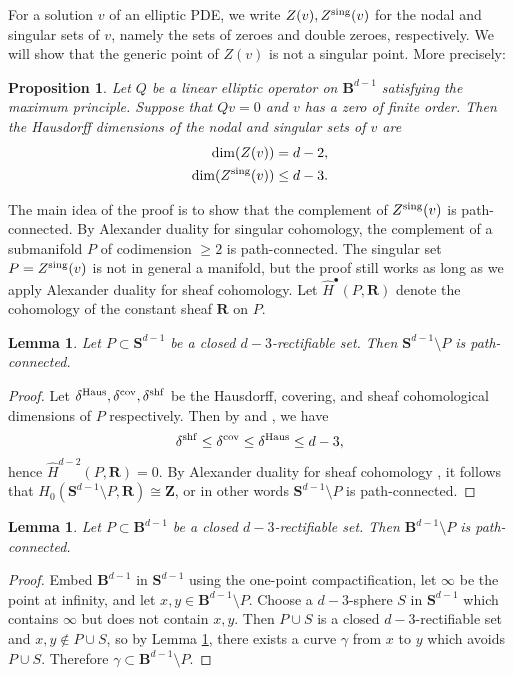 \documentclass[reqno,11pt]{amsart}
\newcommand{\ZZ}{\mathbf{Z}}
\newcommand{\RR}{\mathbf{R}}
\newcommand{\Sph}{\mathbf S}
\newcommand{\Ball}{\mathbf{B}}
\newtheorem{lemma}[theorem]{Lemma}
\newtheorem{proposition}[theorem]{Proposition}
\theoremstyle{definition}
\numberwithin{equation}{section}
\begin{document}
For a solution $v$ of an elliptic PDE, we write $Z(v), Z^{\rm sing}(v)$ for the nodal and singular sets of $v$, namely the sets of zeroes and double zeroes, respectively.
We will show that the generic point of $Z(v)$ is not a singular point. More precisely:

\begin{proposition}\label{nodal set is generically smooth}
Let $Q$ be a linear elliptic operator on $\Ball^{d - 1}$ satisfying the maximum principle.
Suppose that $Qv = 0$ and $v$ has a zero of finite order.
Then the Hausdorff dimensions of the nodal and singular sets of $v$ are
\begin{align}
	\dim(Z(v)) &= d - 2, \label{nodal dimension}\\
	\dim(Z^{\rm sing}(v)) &\leq d - 3. \label{singular nodal dimension}
\end{align}
\end{proposition}

The main idea of the proof is to show that the complement of $Z^{\rm sing}(v)$ is path-connected.
By Alexander duality for singular cohomology, the complement of a submanifold $P$ of codimension $\geq 2$ is path-connected.
The singular set $P = Z^{\rm sing}(v)$ is not in general a manifold, but the proof still works as long as we apply Alexander duality for sheaf cohomology.
Let $\hat H^\bullet(P, \RR)$ denote the cohomology of the constant sheaf $\RR$ on $P$.

\begin{lemma}\label{closed mfld complement}
Let $P \subset \Sph^{d - 1}$ be a closed $d - 3$-rectifiable set.
Then $\Sph^{d - 1} \setminus P$ is path-connected.
\end{lemma}
\begin{proof}
Let $\delta^{\rm Haus}, \delta^{\rm cov}, \delta^{\rm shf}$ be the Hausdorff, covering, and sheaf cohomological dimensions of $P$ respectively.
Then by \cite[{\S}II.5.12]{godement1973topologie} and \cite[Theorem 6.3.10]{edgar2008measure}, we have 
$$\delta^{\rm shf} \leq \delta^{\rm cov} \leq \delta^{\rm Haus} \leq d - 3,$$
hence $\hat H^{d - 2}(P, \RR) = 0$.
By Alexander duality for sheaf cohomology \cite[Theorem 6]{Kaplan47}, it follows that $H_0(\Sph^{d - 1} \setminus P, \RR) \cong \ZZ$, or in other words $\Sph^{d - 1} \setminus P$ is path-connected.
\end{proof}

\begin{lemma}\label{open mfld complement}
Let $P \subset \Ball^{d - 1}$ be a closed $d - 3$-rectifiable set.
Then $\Ball^{d - 1} \setminus P$ is path-connected.
\end{lemma}
\begin{proof}
Embed $\Ball^{d - 1}$ in $\Sph^{d - 1}$ using the one-point compactification, let $\infty$ be the point at infinity, and let $x, y \in \Ball^{d - 1} \setminus P$.
Choose a $d - 3$-sphere $S$ in $\Sph^{d - 1}$ which contains $\infty$ but does not contain $x, y$.
Then $P \cup S$ is a closed $d - 3$-rectifiable set and $x, y \notin P \cup S$, so by Lemma \ref{closed mfld complement}, there exists a curve $\gamma$ from $x$ to $y$ which avoids $P \cup S$.
Therefore $\gamma \subset \Ball^{d - 1} \setminus P$.
\end{proof}
\end{document}
